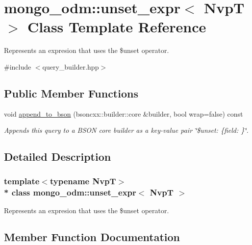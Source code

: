 \hypertarget{classmongo__odm_1_1unset__expr}{}\section{mongo\+\_\+odm\+:\+:unset\+\_\+expr$<$ NvpT $>$ Class Template Reference}
\label{classmongo__odm_1_1unset__expr}


Represents an expresion that uses the \$unset operator.  




{\ttfamily \#include $<$query\+\_\+builder.\+hpp$>$}

\subsection*{Public Member Functions}
\begin{DoxyCompactItemize}
\item 
void \hyperlink{classmongo__odm_1_1unset__expr_a5d775357c94e0477351fb49d71378694}{append\+\_\+to\+\_\+bson} (bsoncxx\+::builder\+::core \&builder, bool wrap=false) const 
\begin{DoxyCompactList}\small\item\em Appends this query to a B\+S\+ON core builder as a key-\/value pair \char`\"{}\$unset\+: \{field\+: \textquotesingle{}\textquotesingle{}\}\char`\"{}. \end{DoxyCompactList}\end{DoxyCompactItemize}


\subsection{Detailed Description}
\subsubsection*{template$<$typename NvpT$>$\\*
class mongo\+\_\+odm\+::unset\+\_\+expr$<$ Nvp\+T $>$}

Represents an expresion that uses the \$unset operator. 

\subsection{Member Function Documentation}
